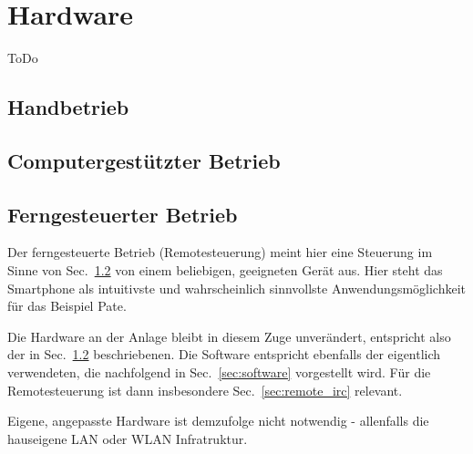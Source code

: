 \section{Hardware}
\label{sec:hardware}

ToDo

\subsection{Handbetrieb}
\label{sec:manual_operation}



\subsection{Computergest\"utzter Betrieb}
\label{sec:pc_operation}



\subsection{Ferngesteuerter Betrieb}
\label{sec:remote_operation}

Der ferngesteuerte Betrieb (Remotesteuerung) meint hier eine Steuerung im Sinne von Sec.~\ref{sec:pc_operation} von einem beliebigen, geeigneten Ger\"at aus.
Hier steht das Smartphone als intuitivste und wahrscheinlich sinnvollste Anwendungsm\"oglichkeit f\"ur das Beispiel Pate.

Die Hardware an der Anlage bleibt in diesem Zuge unver\"andert, entspricht also der in Sec.~\ref{sec:pc_operation} beschriebenen.
Die Software entspricht ebenfalls der eigentlich verwendeten, die nachfolgend in Sec.~\ref{sec:software} vorgestellt wird.
F\"ur die Remotesteuerung ist dann insbesondere Sec.~\ref{sec:remote_irc} relevant.

Eigene, angepasste Hardware ist demzufolge nicht notwendig - allenfalls die hauseigene LAN oder WLAN Infratruktur.